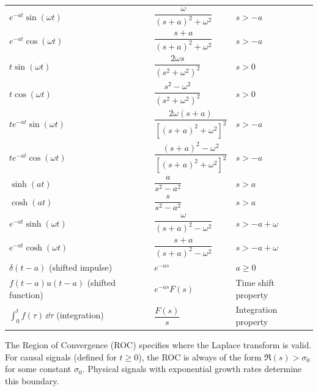 \begin{longtable}{lll}
    $e^{-at}\sin(\omega t)$ & $\dfrac{\omega}{(s+a)^2 + \omega^2}$ & $s > -a$ \\
    $e^{-at}\cos(\omega t)$ & $\dfrac{s+a}{(s+a)^2 + \omega^2}$ & $s > -a$ \\

    $t \sin(\omega t)$ & $\dfrac{2\omega s}{(s^2 + \omega^2)^2}$ & $s > 0$ \\
    $t \cos(\omega t)$ & $\dfrac{s^2 - \omega^2}{(s^2 + \omega^2)^2}$ & $s > 0$ \\
    $t e^{-at} \sin(\omega t)$ & $\dfrac{2\omega(s+a)}{[(s+a)^2 + \omega^2]^2}$ & $s > -a$ \\
    $t e^{-at} \cos(\omega t)$ & $\dfrac{(s+a)^2 - \omega^2}{[(s+a)^2 + \omega^2]^2}$ & $s > -a$ \\

    $\sinh(at)$ & $\dfrac{a}{s^2 - a^2}$ & $s > a$ \\
    $\cosh(at)$ & $\dfrac{s}{s^2 - a^2}$ & $s > a$ \\
    $e^{-at}\sinh(\omega t)$ & $\dfrac{\omega}{(s+a)^2 - \omega^2}$ & $s > -a + \omega$ \\
    $e^{-at}\cosh(\omega t)$ & $\dfrac{s+a}{(s+a)^2 - \omega^2}$ & $s > -a + \omega$ \\

    $\delta(t-a)$ (shifted impulse) & $e^{-as}$ & $a \geq 0$ \\
    $f(t-a)u(t-a)$ (shifted function) & $e^{-as}F(s)$ & Time shift property \\
    $\int_0^t f(\tau) \, \dd\tau$ (integration) & $\dfrac{F(s)}{s}$ & Integration property \\

\end{longtable}

\begin{keyconceptbox}[title=ROC and Stability]
The Region of Convergence (ROC) specifies where the Laplace transform is valid. For causal signals (defined for $t \geq 0$), the ROC is always of the form $\Re(s) > \sigma_0$ for some constant $\sigma_0$. Physical signals with exponential growth rates determine this boundary.
\end{keyconceptbox}

